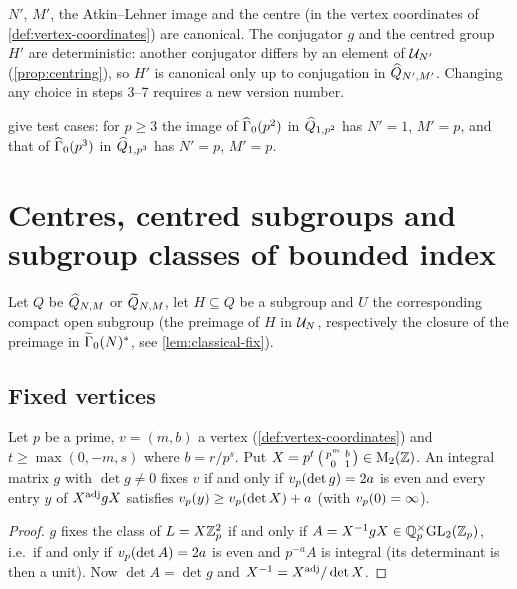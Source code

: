 \begin{remark}[Determinacy]
$N'$, $M'$, the Atkin--Lehner image and the centre (in the vertex coordinates
of \cref{def:vertex-coordinates}) are canonical. The conjugator $g$ and the
centred group $H'$ are deterministic: another conjugator differs by an element
of $\mathcal{U}_{N'}$ (\cref{prop:centring}), so $H'$ is canonical only up to
conjugation in $\widehat{Q}_{N',M'}$. Changing any choice in steps
3--7 requires a new version number.
\end{remark}

\begin{remark}
 give test cases: for $p \geq 3$
the image of $\GammaZero[ad]{p^2}$ in $\widehat{Q}_{1,p^2}$ has
$N' = 1$, $M' = p$, and that of $\GammaZero[ad]{p^3}$ in
$\widehat{Q}_{1,p^3}$ has $N' = p$, $M' = p$.
\end{remark}

\section{Centres, centred subgroups and subgroup classes of bounded index}
\label{sec:subgroup-classes}

Let $Q$ be $\widehat{Q}_{N,M}$ or $\widetilde{Q}_{N,M}$, let
$H \subseteq Q$ be a subgroup and $U$ the corresponding compact open subgroup
(the preimage of $H$ in $\mathcal{U}_{N}$, respectively the closure of the
preimage in $\GammaZeroStar[lift]{N}$, see \cref{lem:classical-fix}).

\subsection*{Fixed vertices}

\begin{lemma}\label{lem:fixed-vertex-test}
Let $p$ be a prime, $v = (m, b)$ a vertex (\cref{def:vertex-coordinates}) and
$t \geq \max(0, -m, s)$ where $b = r/p^s$. Put
$X = p^t\left(\begin{smallmatrix} p^m & b \\ 0 & 1 \end{smallmatrix}\right) \in \mathrm{M}_{2}(\mathbb{Z})$. An integral matrix $g$
with $\det g \neq 0$ fixes $v$ if and only if $v_{p}(\det g) = 2a$ is even
and every entry $y$ of $X^{\mathrm{adj}}gX$ satisfies
$v_{p}(y) \geq v_{p}(\det X) + a$ (with $v_{p}(0) = \infty$).
\end{lemma}

\begin{proof}
$g$ fixes the class of $L = X\mathbb{Z}_{p}^2$ if and only if
$A = X^{-1}gX \in \unit{\pAdicNumbers{p}}\GL{2}{\pAdicIntegers{p}}$, i.e.\ if and
only if $v_{p}(\det A) = 2a$ is even and $p^{-a}A$ is integral (its
determinant is then a unit). Now $\det A = \det g$ and
$X^{-1} = X^{\mathrm{adj}}/\det X$.
\end{proof}

